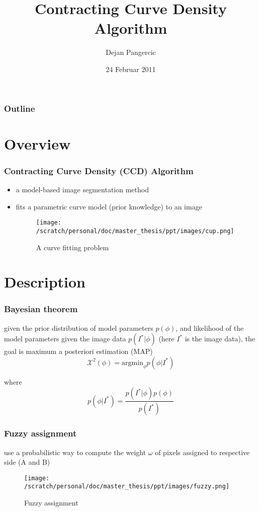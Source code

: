 \documentclass[english,10pt,presentation]{beamer}
\begin{document}
\title{Contracting Curve Density Algorithm}
\author{Dejan Pangercic}
\date{24 Februar 2011}
\maketitle

\begin{frame}
\frametitle{Outline}
\setcounter{tocdepth}{2}
\tableofcontents
\end{frame}

\section{Overview}
\label{sec-1}
\begin{frame}
\frametitle{Contracting Curve Density (CCD) Algorithm}
\label{sec-1_1}
\begin{itemize}

\item a model-based image segmentation method\\
\label{sec-1_1_1}%
\item fits a parametric curve model (prior knowledge) to an image\\
\label{sec-1_1_2}%
\begin{figure}[htb]
\centering
\texttt{[image: /scratch/personal/doc/master\_thesis/ppt/images/cup.png]}
\caption{\label{fig:1}A curve fitting problem}
\end{figure}

\end{itemize} %
\end{frame}
\section{Description}
\label{sec-2}
\begin{frame}
\frametitle{Bayesian theorem}
\label{sec-2_1}

    given the prior distribution of model parameters $p(\phi)$, and
    likelihood of the model parameters given the image data
    $p(I^*|\phi)$ (here $I^{*}$ is the image data), the goal is
    maximum a posteriori estimation (MAP)
\begin{displaymath}
\mathcal{X}^2(\phi) = \mathrm{argmin}_{\phi} p(\phi|I^*)
\end{displaymath}

where 
\begin{displaymath}
p(\phi|I^*) = \frac{p(I^*|\phi) p(\phi)}{p(I^{*})}
\end{displaymath}
\end{frame}
\begin{frame}
\frametitle{Fuzzy assignment}
\label{sec-2_2}

use a probabilistic way to compute the weight $\omega$ of pixels assigned to
respective side (A and B)
\begin{figure}[htb]
\centering
\texttt{[image: /scratch/personal/doc/master\_thesis/ppt/images/fuzzy.png]}
\caption{\label{fig:2}Fuzzy assignment}
\end{figure}
\end{frame}
\end{document}
